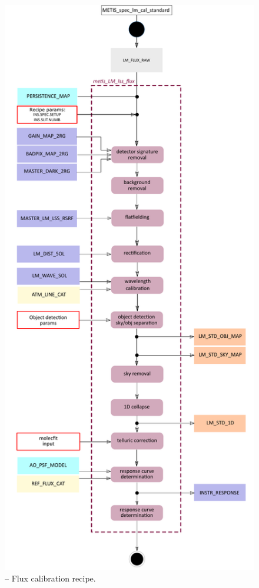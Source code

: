 \begin{figure}[ht]
  \centering
  \includegraphics[width=0.4\textheight]{figures/metis_lm_lss_flux_v0.65.pdf}
  \caption[Recipe: ]{ --
    Flux calibration recipe.}
  \label{Fig:rec_lm_lss_flux}
\end{figure}
